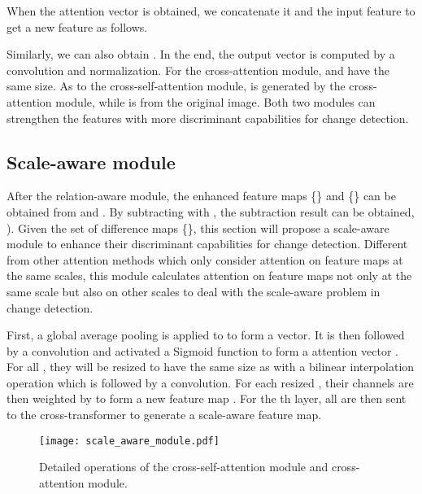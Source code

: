 \documentclass[letterpaper]{article} \usepackage{aaai23}  \usepackage{times}  \usepackage{helvet}  \usepackage{courier}  \usepackage[hyphens]{url}  \usepackage{graphicx} \urlstyle{rm} \def\UrlFont{\rm}  \usepackage{natbib}  \usepackage{caption} \frenchspacing  \setlength{\pdfpagewidth}{8.5in}  \setlength{\pdfpageheight}{11in}  \usepackage{algorithm}
\begin{document}
When the attention vector is obtained, we concatenate it and the input feature  to get a new feature  as follows. 



Similarly, we can also obtain . In the end, the output vector is computed by a  convolution and normalization. For the cross-attention module,  and  have the same size. As to the cross-self-attention module,  is generated by the cross-attention module, while  is from the original image. Both two modules can strengthen the features with more discriminant capabilities for change detection.

\subsection{Scale-aware module }

  After the relation-aware module, the enhanced feature maps \{\} and \{\} can be obtained from  and .
  By subtracting  with , the subtraction result  can be obtained,  ).  Given the set of difference maps \{\}, this section will propose a scale-aware module to enhance their discriminant capabilities for change detection. Different from other attention methods which only consider attention on feature maps at the same scales, this module calculates attention on feature maps not only at the same scale but also on other scales to deal with the scale-aware problem in change detection. 
  
  First, a global average pooling is applied to  to form a  vector. It is then followed by a  convolution and activated a Sigmoid function to form a  attention vector . For all , they will be resized to have the same size as  with a bilinear interpolation operation which is followed by a  convolution. For each resized , their channels are then weighted by  to form a new feature map . For the th layer, all  are then sent to the cross-transformer to generate a scale-aware feature map. 
 
\begin{figure}[t]
\centering
\texttt{[image: scale\_aware\_module.pdf]}
\caption{  Detailed operations of the cross-self-attention module and cross-attention module.}
\label{relation_aware}
\end{figure}
\end{document}
